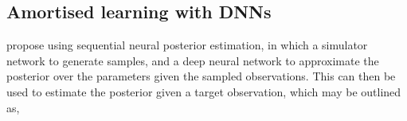 \documentclass[mphil,deptreport,ianc]{infthesis} %
\begin{document}




\subsection{Amortised learning with DNNs}

\cite{Lueckmann2018} propose using sequential neural posterior estimation, in which a simulator network to generate samples, and a deep neural network to approximate the posterior over the parameters given the sampled observations.
This can then be used to estimate the posterior given a target observation, which may be outlined as,
\end{document}

